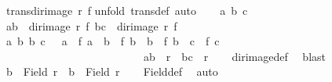 \begin{isabellebody}
\ {\isachardoublequoteopen}trans{\isacharparenleft}{\kern0pt}dir{\isacharunderscore}{\kern0pt}image\ r\ f{\isacharparenright}{\kern0pt}{\isachardoublequoteclose}\isanewline
%
\isadelimproof
%
\endisadelimproof
%
\isatagproof
{}\isamarkupfalse%
{\isacharparenleft}{\kern0pt}unfold\ trans{\isacharunderscore}{\kern0pt}def{\isacharcomma}{\kern0pt}\ auto{\isacharparenright}{\kern0pt}\isanewline
\ \ \isamarkupfalse%
\ a{\isacharprime}{\kern0pt}\ b{\isacharprime}{\kern0pt}\ c{\isacharprime}{\kern0pt}\isanewline
\ \ \isamarkupfalse%
\ {\isachardoublequoteopen}{\isacharparenleft}{\kern0pt}a{\isacharprime}{\kern0pt}{\isacharcomma}{\kern0pt}b{\isacharprime}{\kern0pt}{\isacharparenright}{\kern0pt}\ {\isasymin}\ dir{\isacharunderscore}{\kern0pt}image\ r\ f{\isachardoublequoteclose}\ {\isachardoublequoteopen}{\isacharparenleft}{\kern0pt}b{\isacharprime}{\kern0pt}{\isacharcomma}{\kern0pt}c{\isacharprime}{\kern0pt}{\isacharparenright}{\kern0pt}\ {\isasymin}\ dir{\isacharunderscore}{\kern0pt}image\ r\ f{\isachardoublequoteclose}\isanewline
\ \ \isamarkupfalse%
\ \isamarkupfalse%
\ a\ b{}\ b{}\ c\ \ {}{\isacharcolon}{\kern0pt}\ {\isachardoublequoteopen}a{\isacharprime}{\kern0pt}\ {\isacharequal}{\kern0pt}\ f\ a\ {\isasymand}\ b{\isacharprime}{\kern0pt}\ {\isacharequal}{\kern0pt}\ f\ b{}\ {\isasymand}\ b{\isacharprime}{\kern0pt}\ {\isacharequal}{\kern0pt}\ f\ b{}\ {\isasymand}\ c{\isacharprime}{\kern0pt}\ {\isacharequal}{\kern0pt}\ f\ c{\isachardoublequoteclose}\ \isanewline
\ \ \ \ \ \ \ \ \ \ \ \ \ \ \ \ \ \ \ \ \ \ \ \ \ {}{\isacharcolon}{\kern0pt}\ {\isachardoublequoteopen}{\isacharparenleft}{\kern0pt}a{\isacharcomma}{\kern0pt}b{}{\isacharparenright}{\kern0pt}\ {\isasymin}\ r\ {\isasymand}\ {\isacharparenleft}{\kern0pt}b{}{\isacharcomma}{\kern0pt}c{\isacharparenright}{\kern0pt}\ {\isasymin}\ r{\isachardoublequoteclose}\isanewline
\ \ \isamarkupfalse%
\ dir{\isacharunderscore}{\kern0pt}image{\isacharunderscore}{\kern0pt}def\ \isamarkupfalse%
\ blast\isanewline
\ \ \isamarkupfalse%
\ {\isachardoublequoteopen}b{}\ {\isasymin}\ Field\ r\ {\isasymand}\ b{}\ {\isasymin}\ Field\ r{\isachardoublequoteclose}\isanewline
\ \ \isamarkupfalse%
\ Field{\isacharunderscore}{\kern0pt}def\ \isamarkupfalse%
\ auto\isanewline
\ \ \isamarkupfalse%

\end{isabellebody}
